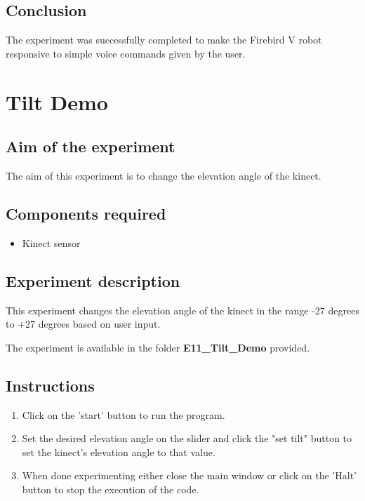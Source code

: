 \begin{flushleft}
\subsection{\textbf{ Conclusion}}
The experiment was successfully completed to make the Firebird V robot responsive to simple voice commands given by the user.
\newpage

\section{\textbf{ Tilt Demo}}

\label{4.11}
\medskip
\subsection{\textbf{ Aim of the experiment}}
The aim of this experiment is to change the elevation angle of the kinect.
\medskip

\subsection{\textbf{ Components required}}
\begin{itemize}
\item Kinect sensor
\end{itemize}
\medskip

\subsection{\textbf{ Experiment description}}
This experiment changes the elevation angle of the kinect in the range -27 degrees to +27 degrees based on user input.

\medskip
The experiment is available in the folder \textbf{E11\_Tilt\_Demo} provided.
\medskip

\subsection{\textbf{ Instructions}}
\begin{enumerate}
\item Click on the 'start' button to run the program.
\item Set the desired elevation angle on the slider and click the "set tilt" button to set the kinect's elevation angle to that value.
\item When done experimenting either close the main window or click on the 'Halt' button to stop the execution of the code.
\end{enumerate}
\medskip

\end{flushleft}
